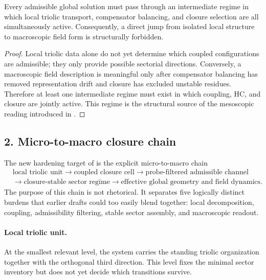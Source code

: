 \begin{lemma}
\label{lem:intermediate-balance}
Every admissible global solution must pass through an intermediate regime in
which local triolic transport, compensator balancing, and closure selection are
all simultaneously active. Consequently, a direct jump from isolated local
structure to macroscopic field form is structurally forbidden.
\end{lemma}

\begin{proof}
Local triolic data alone do not yet determine which coupled configurations are
admissible; they only provide possible sectorial directions. Conversely, a
macroscopic field description is meaningful only after compensator balancing
has removed representation drift and closure has excluded unstable residues.
Therefore at least one intermediate regime must exist in which coupling, HC,
and closure are jointly active. This regime is the structural source of the
mesoscopic reading introduced in .
\end{proof}

\subsection*{2. Micro-to-macro closure chain}
The new hardening target of  is the explicit micro-to-macro chain
\[
\begin{aligned}
&\text{local triolic unit} \longrightarrow \text{coupled closure cell} \longrightarrow \text{probe-filtered admissible channel}\\
&\longrightarrow \text{closure-stable sector regime} \longrightarrow \text{effective global geometry and field dynamics}.
\end{aligned}
\]
The purpose of this chain is not rhetorical. It separates five logically
distinct burdens that earlier drafts could too easily blend together:
local decomposition, coupling, admissibility filtering, stable sector assembly,
and macroscopic readout.

\paragraph{Local triolic unit.}
At the smallest relevant level, the system carries the standing triolic
organization together with the orthogonal third direction. This level fixes the
minimal sector inventory but does not yet decide which transitions survive.

